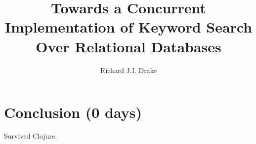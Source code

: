 \documentclass[grad]{uoit-thesis}
\author{Richard J.I. Drake}
\title{Towards a Concurrent Implementation of Keyword Search Over Relational Databases}
\begin{document}
	
	
	
	\begin{preliminary}
		\maketitle

		\setcounter{page}{3}

		\tableofcontents

		\listoftables
		\listoffigures
		\listofalgorithms
		\printglossaries
	\end{preliminary}
	
	
	
	
	
	
	
	
	
	
	
	\chapter{Conclusion (0 days)}
		Survived Clojure.

	\appendix
	
	\begin{singlespaced}
		
	\end{singlespaced}
	
	
	
	\printbibliography
	
	
	\todos
\end{document}
